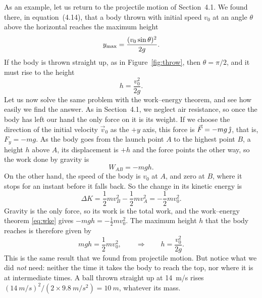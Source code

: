 \documentclass[11pt,a4paper]{article}
\begin{document}
As an example, let us return to the projectile motion of Section~4.1. We found there, in
equation~(4.14), that a body thrown with initial speed $v_0$ at an angle $\theta$ above the
horizontal reaches the maximum height
\begin{equation}\label{eq:ymax}
  y_{\mathrm{max}} = \frac{(v_0\sin\theta)^2}{2g} .
\end{equation}
If the body is thrown straight up, as in Figure~\ref{fig:throw}, then $\theta = \pi/2$, and it must
rise to the height
\begin{equation}\label{eq:h-kin}
  h = \frac{v_0^2}{2g} .
\end{equation}
Let us now solve the same problem with the work--energy theorem, and see how easily we find the
answer. As in Section~4.1, we neglect air resistance, so once the body has left our hand the only
force on it is its weight. If we choose the direction of the initial velocity $\vec{v}_0$ as the $+y$
axis, this force is $\vec{F} = -mg\,\hat{\jmath}$, that is, $F_y = -mg$. As the body goes from the launch
point $A$ to the highest point $B$, a height $h$ above $A$, its displacement is $+h$ and the force
points the other way, so the work done by gravity is
\begin{equation}\label{eq:Wgrav-up}
  W_{AB} = -mgh .
\end{equation}
On the other hand, the speed of the body is $v_0$ at $A$, and zero at $B$, where it stops for an
instant before it falls back. So the change in its kinetic energy is
\begin{equation}\label{eq:dK-up}
  \Delta K = \frac12 mv_B^2 - \frac12 mv_A^2 = -\frac12 mv_0^2 .
\end{equation}
Gravity is the only force, so its work is the total work, and the work--energy theorem \eqref{eq:wke}
gives $-mgh = -\frac12 mv_0^2$. The maximum height $h$ that the body reaches is therefore given by
\begin{equation}\label{eq:h-energy}
  mgh = \frac12 mv_0^2 , \qquad\Rightarrow\qquad h = \frac{v_0^2}{2g} .
\end{equation}
This is the same result that we found from projectile motion. But notice what we did \emph{not} need:
neither the time it takes the body to reach the top, nor where it is at intermediate times. A ball
thrown straight up at \qty{14}{m/s} rises $(\qty{14}{m/s})^2/(2\times\qty{9.8}{m/s^2}) = \qty{10}{m}$,
whatever its mass.
\end{document}
